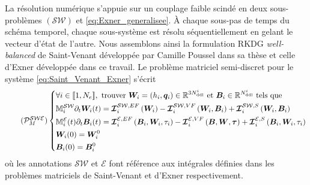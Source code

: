 \documentclass[11pt, a4paper, oneside]{report}
\begin{document}
La résolution numérique s'appuie sur un couplage faible scindé en deux sous-problèmes $(\mathcal{SW})$ et \eqref{eq:Exner_generalisee}. À chaque sous-pas de temps du schéma temporel, chaque sous-système est résolu séquentiellement en gelant le vecteur d'état de l'autre. Nous assemblons ainsi la formulation RKDG \textit{well-balanced} de Saint-Venant développée par Camille Poussel dans sa thèse \cite{poussel2024dynamique} et celle d'Exner développée dans ce travail.
Le problème matriciel semi-discret pour le système \eqref{eq:Saint_Venant_Exner} s'écrit
\begin{equation} \tag{$\mathcal{P}_M^\mathcal{SWE}$}
    \left \{
    \begin{aligned}
        & \forall i \in \llbracket 1, N_e \rrbracket, \text{ trouver } \bm{W}_i = (h_i, \bm{q}_i) \in \mathbb{R}^{3N_\text{ddl}^i} \text{ et } \bm{B}_i \in \mathbb{R}^{N_\text{ddl}^i} \text{ tels que} \\
        & \mathbb{M}_i^\mathcal{SW} \partial_t \bm{W}_i(t) = \bm{\mathcal{I}}_i^{\mathcal{SW}, EF} \left( \bm{W}_i \right) - \bm{\mathcal{I}}_i^{\mathcal{SW}, VF} \left( \bm{W}_i, \bm{B}_i \right) + \bm{\mathcal{I}}_i^{\mathcal{SW}, S} \left( \bm{W}_i, \bm{B}_i \right) \\
        & \mathbb{M}_i^\mathcal{E}(t) \partial_t \bm{B}_i(t) = \bm{\mathcal{I}}_i^{\mathcal{E}, EF} \left( \bm{B}_i, \bm{W}_i , \tau_i \right) - \bm{\mathcal{I}}_i^{\mathcal{E}, VF} \left( \bm{B}, \bm{W}, \bm{\tau} \right) + \bm{\mathcal{I}}_i^{\mathcal{E}, S} \left( \bm{B}_i, \bm{W}_i, \tau_i \right) \\
        & \bm{W}_i(0) = \bm{W}_i^0 \\
        & \bm{B}_i(0) = \bm{B}_i^0
    \end{aligned}
    \right .
\end{equation}
où les annotations $\mathcal{SW}$ et $\mathcal{E}$ font référence aux intégrales définies dans les problèmes matriciels de Saint-Venant et d'Exner respectivement. \\
\end{document}
